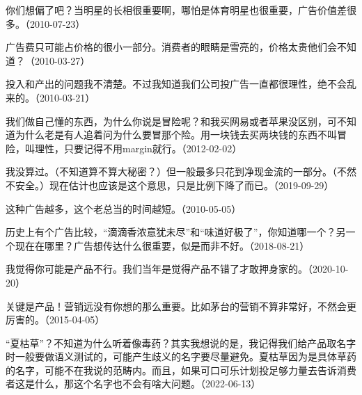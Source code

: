 你们想偏了吧？当明星的长相很重要啊，哪怕是体育明星也很重要，广告价值差很多。（2010-07-23）


广告费只可能占价格的很小一部分。消费者的眼睛是雪亮的，价格太贵他们会不知道？（2010-03-27）

投入和产出的问题我不清楚。不过我知道我们公司投广告一直都很理性，绝不会乱来的。（2010-03-21）


我们做自己懂的东西，为什么你说是冒险呢？和我买网易或者苹果没区别，可不知道为什么老是有人追着问为什么要冒那个险。用一块钱去买两块钱的东西不叫冒险，叫理性，只要记得不用margin就行。（2012-02-02）


我没算过。（不知道算不算大秘密？）但一般最多只花到净现金流的一部分。（不然不安全。）现在估计也应该是这个意思，只是比例下降了而已。（2019-09-29）


这种广告越多，这个老总当的时间越短。（2010-05-05）

历史上有个广告比较，“滴滴香浓意犹未尽”和“味道好极了”，你知道哪一个？另一个现在在哪里？广告想传达什么很重要，似是而非不好。（2018-08-21）


我觉得你可能是产品不行。我们当年是觉得产品不错了才敢押身家的。（2020-10-20）


关键是产品！营销远没有你想的那么重要。比如茅台的营销不算非常好，不然会更厉害的。（2015-04-05）


“夏枯草”？不知道为什么听着像毒药？其实我想说的是，我记得我们给产品取名字时一般要做语义测试的，可能产生歧义的名字要尽量避免。夏枯草因为是具体草药的名字，可能不在我说的范畴内。而且，如果可口可乐计划投足够力量去告诉消费者这是什么，那这个名字也不会有啥大问题。（2022-06-13）

